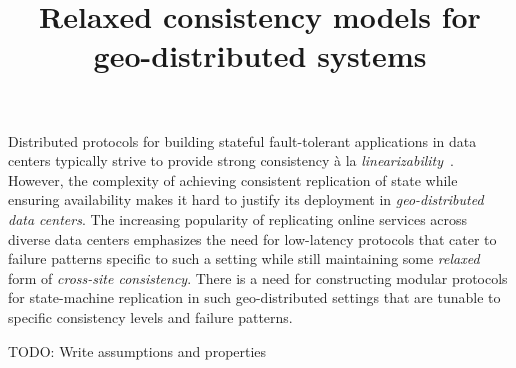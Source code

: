 \documentclass[10pt,pdftex,a4paper]{article}%
\begin{document}


\title{Relaxed consistency models for geo-distributed systems}
\date{}
\maketitle
%
%
\begin{abstract}
%
\end{abstract}
%
Distributed protocols for building stateful fault-tolerant applications in data centers typically strive to provide strong consistency \`a la \emph{linearizability}~\cite{Her91}.
However, the complexity of achieving consistent replication of state while ensuring availability makes it hard to justify its deployment in \emph{geo-distributed data centers}.
The increasing popularity of replicating online services across diverse data centers emphasizes 
the need for low-latency protocols that cater to failure patterns specific to such a setting while still maintaining 
some \emph{relaxed} form of \emph{cross-site consistency}. There is a need for constructing modular protocols for state-machine replication
in such geo-distributed settings that are tunable to specific consistency levels and failure patterns.
%
\par 
{\color{red} TODO: Write assumptions and properties}
\end{document}
